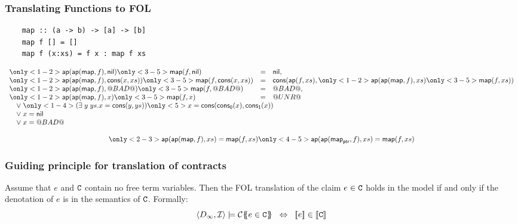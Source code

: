 \documentclass[serif,professionalfont]{beamer}
\begin{document}
\begin{frame}[fragile]
  \frametitle{Translating Functions to FOL}

  \begin{verbatim}
    map :: (a -> b) -> [a] -> [b]
    map f [] = []
    map f (x:xs) = f x : map f xs
  \end{verbatim}

  \newcommand\cmap[2]{
    \only<1-2>{\appp{\maps}{#1}{#2}}
    \only<3-5>{\map{#1}{#2}}
  }

  \[\begin{array}{lll}
  \cmap{f}{\nil}         & = & \nil, \\
  \cmap{f}{\cons{x}{xs}} & = & \cons{\app{f}{xs}}{\cmap{f}{xs}}  \\
  \cmap{f}{\bad}         & = & \bad, \\
  \cmap{f}{x}            & = & \unr \\
  \multicolumn{3}{l}{\quad \lor \; \only<1-4>{(\exists \; y \; ys . x = \cons{y}{ys})}
                                   \only<5>{x = \cons{\conspi{x}}{\conspii{x}}}} \\
  \multicolumn{3}{l}{\quad \lor \; x = \nil} \\
  \multicolumn{3}{l}{\quad \lor \; x = \bad} \\
  \\
  \multicolumn{3}{c}{
    \only<2-3>{\appp{\maps}{f}{xs} = \map{f}{xs}}
    \only<4-5>{\appp{\ptr{\maps}}{f}{xs} = \map{f}{xs}}
  }
  \end{array}\]
\end{frame}

\begin{frame}[fragile]
  \frametitle{Guiding principle for translation of contracts}

  \begin{theorem}
    Assume that $e$ and ${\tt C}$ contain no free term variables. Then
    the FOL translation of the claim $e \in {\tt C}$ holds in the model
    if and only if the denotation of $e$ is in the semantics of
    ${\tt C}$.  Formally:
    $$\langle D_\infty,{\cal I}\rangle \models \trc{e \in \Ct}
      \;\; \Leftrightarrow \;\; \dbrace{e} \in \dbrace{\Ct}
    $$
  \end{theorem}
\end{frame}
\end{document}
